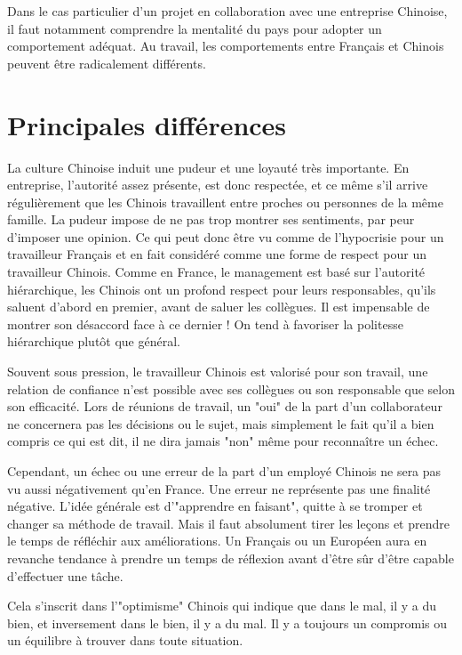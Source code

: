 \documentclass{article}
\begin{document}
Dans le cas particulier d'un projet en collaboration avec une entreprise Chinoise, il faut notamment comprendre la mentalité du pays pour adopter un comportement adéquat. Au travail, les comportements entre Français et Chinois peuvent être radicalement différents. \\


\section{Principales différences}
La culture Chinoise induit une pudeur et une loyauté très importante. En entreprise, l'autorité assez présente, est donc respectée, et ce même s'il arrive régulièrement que les Chinois travaillent entre proches ou personnes de la même famille. La pudeur impose de ne pas trop montrer ses sentiments, par peur d'imposer une opinion. Ce qui peut donc être vu comme de l'hypocrisie pour un travailleur Français et en fait considéré comme une forme de respect pour un travailleur Chinois.
Comme en France, le management est basé sur l'autorité hiérarchique, les Chinois ont un profond respect pour leurs responsables, qu'ils saluent d'abord en premier, avant de saluer les collègues. Il est impensable de montrer son désaccord face à ce dernier ! On tend à favoriser la politesse hiérarchique plutôt que général.

Souvent sous pression, le travailleur Chinois est valorisé pour son travail, une relation de confiance n'est possible avec ses collègues ou son responsable que selon son efficacité. Lors de réunions de travail, un "oui" de la part d'un collaborateur ne concernera pas les décisions ou le sujet, mais simplement le fait qu'il a bien compris ce qui est dit, il ne dira jamais "non" même pour reconnaître un échec.

Cependant, un échec ou une erreur de la part d'un employé Chinois ne sera pas vu aussi négativement qu'en France. Une erreur ne représente pas une finalité négative. L'idée générale est d'"apprendre en faisant", quitte à se tromper et changer sa méthode de travail. Mais il faut absolument tirer les leçons et prendre le temps de réfléchir aux améliorations. Un Français ou un Européen aura en revanche tendance à prendre un temps de réflexion avant d'être sûr d'être capable d'effectuer une tâche.

Cela s'inscrit dans l'"optimisme" Chinois qui indique que dans le mal, il y a du bien, et inversement dans le bien, il y a du mal. Il y a toujours un compromis ou un équilibre à trouver dans toute situation.
\end{document}
